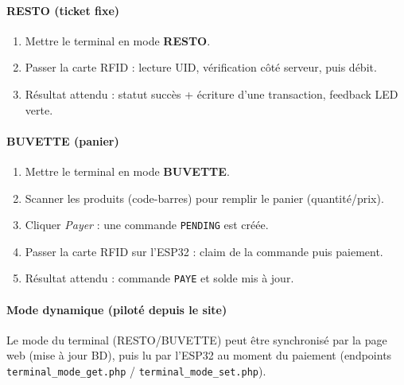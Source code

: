 \documentclass[11pt,a4paper]{article}
\begin{document}
\paragraph{RESTO (ticket fixe)}
\begin{enumerate}
  \item Mettre le terminal en mode \textbf{RESTO}.
  \item Passer la carte RFID : lecture UID, vérification côté serveur, puis débit.
  \item Résultat attendu : statut succès + écriture d’une transaction, feedback LED verte.
\end{enumerate}

\paragraph{BUVETTE (panier)}
\begin{enumerate}
  \item Mettre le terminal en mode \textbf{BUVETTE}.
  \item Scanner les produits (code-barres) pour remplir le panier (quantité/prix).
  \item Cliquer \textit{Payer} : une commande \texttt{PENDING} est créée.
  \item Passer la carte RFID sur l’ESP32 : claim de la commande puis paiement.
  \item Résultat attendu : commande \texttt{PAYE} et solde mis à jour.
\end{enumerate}

\paragraph{Mode dynamique (piloté depuis le site)}
Le mode du terminal (RESTO/BUVETTE) peut être synchronisé par la page web (mise à jour BD), puis lu par l’ESP32 au moment du paiement (endpoints \texttt{terminal\_mode\_get.php} / \texttt{terminal\_mode\_set.php}).
\end{document}
